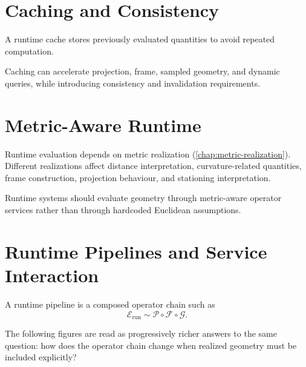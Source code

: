 \section{Caching and Consistency}

\begin{definition}
\label{def:runtime-cache}
A runtime cache stores previously evaluated quantities to avoid repeated
computation.
\end{definition}

Caching can accelerate projection, frame, sampled geometry, and dynamic
queries, while introducing consistency and invalidation requirements.

\section{Metric-Aware Runtime}

Runtime evaluation depends on metric realization
(\cref{chap:metric-realization}). Different realizations affect distance
interpretation, curvature-related quantities, frame construction,
projection behaviour, and stationing interpretation.

\begin{principle}
\label{princ:metric-aware-runtime}
Runtime systems should evaluate geometry through metric-aware operator
services rather than through hardcoded Euclidean assumptions.
\end{principle}

\section{Runtime Pipelines and Service Interaction}

\begin{definition}
\label{def:runtime-pipeline}
A runtime pipeline is a composed operator chain such as
\[
\mathcal E_{\mathrm{run}}
\sim
\mathcal P
\circ
\mathcal F
\circ
\mathcal G.
\]
\end{definition}

The following figures are read as progressively richer answers to the
same question: how does the operator chain change when realized geometry
must be included explicitly?

